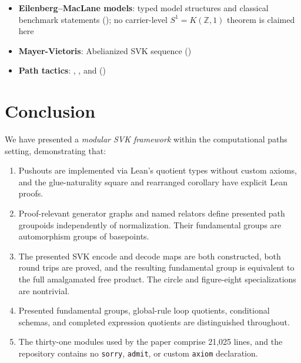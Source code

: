 \documentclass{lmcs}
\theoremstyle{definition}
\theoremstyle{plain}
\theoremstyle{remark}
\newcommand{\ZZ}{\mathbb{Z}}
\begin{document}
\begin{itemize}
    \item \textbf{Eilenberg--MacLane models}: typed model structures and
    classical benchmark statements (); no
    carrier-level \(S^1=K(\ZZ,1)\) theorem is claimed here
    \item \textbf{Mayer-Vietoris}: Abelianized SVK sequence
    ()
    \item \textbf{Path tactics}: , , and
     ()
\end{itemize}

\section{Conclusion}
\label{sec:conclusion}

We have presented a \emph{modular SVK framework} within the computational paths setting, demonstrating that:

\begin{enumerate}
    \item Pushouts are implemented via Lean's quotient types without custom
    axioms, and the glue-naturality square and rearranged corollary have
    explicit Lean proofs.

    \item Proof-relevant generator graphs and named relators define presented
    path groupoids independently of normalization.  Their fundamental groups
    are automorphism groups of basepoints.

    \item The presented SVK encode and decode maps are both constructed, both
    round trips are proved, and the resulting fundamental group is equivalent
    to the full amalgamated free product.  The circle and figure-eight
    specializations are nontrivial.

    \item Presented fundamental groups, global-rule loop quotients, conditional
    schemas, and completed expression quotients are distinguished throughout.

    \item The thirty-one modules used by the paper comprise 21,025 lines, and the
    repository contains no \texttt{sorry}, \texttt{admit}, or custom
    \texttt{axiom} declaration.
\end{enumerate}
\end{document}
